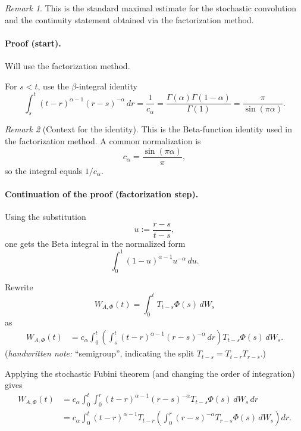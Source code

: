 \documentclass[11pt]{article}
\theoremstyle{definition}
\theoremstyle{remark}
\newtheorem{remark}{Remark}
\begin{document}
\begin{remark}
This is the standard maximal estimate for the stochastic convolution and the continuity statement obtained via the factorization method.
\end{remark}

\paragraph{Proof (start).}
Will use the factorization method.

For $s<t$, use the $\beta$-integral identity
\[
\int_s^t (t-r)^{\alpha-1}(r-s)^{-\alpha}\,dr
=
\frac{1}{c_\alpha}
=
\frac{\Gamma(\alpha)\Gamma(1-\alpha)}{\Gamma(1)}
=
\frac{\pi}{\sin(\pi\alpha)}.
\]

\begin{remark}[Context for the identity]
This is the Beta-function identity used in the factorization method. A common normalization is
\[
c_\alpha = \frac{\sin(\pi\alpha)}{\pi},
\]
so the integral equals $1/c_\alpha$.
\end{remark}

\paragraph{Continuation of the proof (factorization step).}
Using the substitution
\[
u := \frac{r-s}{t-s},
\]
one gets the Beta integral in the normalized form
\[
\int_0^1 (1-u)^{\alpha-1}u^{-\alpha}\,du.
\]

Rewrite
\[
W_{A,\Phi}(t)=\int_0^t T_{t-s}\Phi(s)\,dW_s
\]
as
\[
\begin{aligned}
W_{A,\Phi}(t)
&=
c_\alpha
\int_0^t
\left(
\int_s^t (t-r)^{\alpha-1}(r-s)^{-\alpha}\,dr
\right)
T_{t-s}\Phi(s)\,dW_s.
\end{aligned}
\]
\noindent
(\emph{handwritten note:} ``semigroup'', indicating the split $T_{t-s}=T_{t-r}T_{r-s}$.)

Applying the stochastic Fubini theorem (and changing the order of integration) gives
\[
\begin{aligned}
W_{A,\Phi}(t)
&=
	c_\alpha
	\int_0^t
	\int_0^r
	(t-r)^{\alpha-1}(r-s)^{-\alpha}
	T_{t-s}\Phi(s)\,dW_s\,dr \\
&=
c_\alpha
\int_0^t
(t-r)^{\alpha-1}
T_{t-r}
\left(
\int_0^r
(r-s)^{-\alpha}T_{r-s}\Phi(s)\,dW_s
\right)dr.
\end{aligned}
\]
\end{document}
